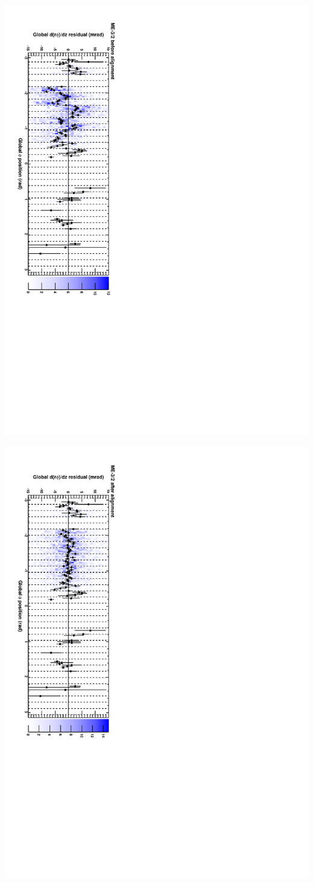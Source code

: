 \documentclass[compress]{beamer}
\begin{document}
\begin{frame}
\includegraphics[height=\linewidth, angle=90]{cscphiy_mem32_before.pdf}

\includegraphics[height=\linewidth, angle=90]{cscphiy_mem32_after.pdf}
\end{frame}
\end{document}
